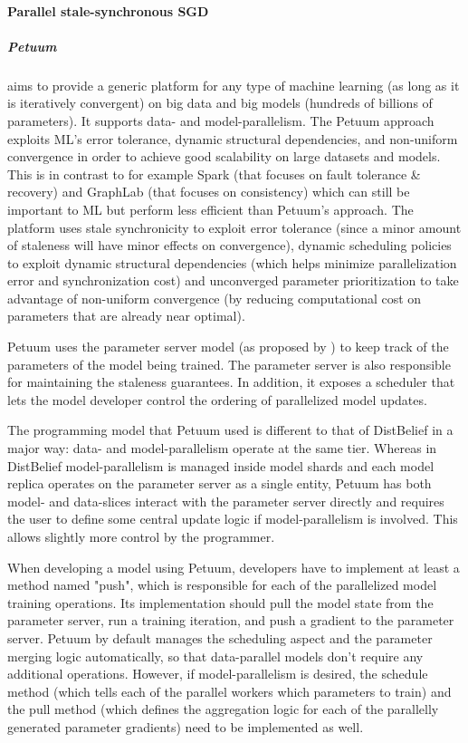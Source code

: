 \paragraph{Parallel stale-synchronous SGD}

\subparagraph{Petuum \citep{Xing2013}}
aims to provide a generic platform for any type of machine learning (as long as it is iteratively convergent) on big data and big models (hundreds of billions of parameters). It supports data- and model-parallelism. The Petuum approach exploits ML’s error tolerance, dynamic structural dependencies, and non-uniform convergence in order to achieve good scalability on large datasets and models. This is in contrast to for example Spark (that focuses on fault tolerance \& recovery) and GraphLab (that focuses on consistency) which can still be important to ML but perform less efficient than Petuum's approach. The platform uses stale synchronicity to exploit error tolerance (since a minor amount of staleness will have minor effects on convergence), dynamic scheduling policies to exploit dynamic structural dependencies (which helps minimize parallelization error and synchronization cost) and unconverged parameter prioritization to take advantage of non-uniform convergence (by reducing computational cost on parameters that are already near optimal). 

Petuum uses the parameter server model (as proposed by \citet{DistBelief2012}) to keep track of the parameters of the model being trained. The parameter server is also responsible for maintaining the staleness guarantees. In addition, it exposes a scheduler that lets the model developer control the ordering of parallelized model updates.

The programming model that Petuum used is different to that of DistBelief in a major way: data- and model-parallelism operate at the same tier. Whereas in DistBelief model-parallelism is managed inside model shards and each model replica operates on the parameter server as a single entity, Petuum has both model- and data-slices interact with the parameter server directly and requires the user to define some central update logic if model-parallelism is involved. This allows slightly more control by the programmer.

When developing a model using Petuum, developers have to implement at least a method named "push", which is responsible for each of the parallelized model training operations. Its implementation should pull the model state from the parameter server, run a training iteration, and push a gradient to the parameter server. Petuum by default manages the scheduling aspect and the parameter merging logic automatically, so that data-parallel models don’t require any additional operations. However, if model-parallelism is desired, the schedule method (which tells each of the parallel workers which parameters to train) and the pull method (which defines the aggregation logic for each of the parallelly generated parameter gradients) need to be implemented as well.


